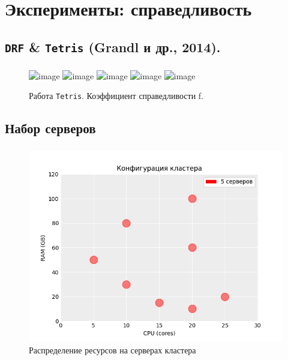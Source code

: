 \documentclass[t]{beamer}  %
\begin{document}
\section{Эксперименты: справедливость}

\subsection{\texttt{DRF} \& \texttt{Tetris} (Grandl и др., 2014).} 

\begin{frame}[fragile]
	\frametitle{\insertsection} 
	\framesubtitle{\insertsubsection}

	\begin{figure}[H]
		\centering
		\includegraphics<1>[width=0.8\linewidth]{images/tetris_pipeline_0} 
		\includegraphics<2>[width=0.8\linewidth]{images/tetris_pipeline_1} 
		\includegraphics<3>[width=0.8\linewidth]{images/tetris_pipeline_2} 
		\includegraphics<4>[width=0.8\linewidth]{images/tetris_pipeline_3} 
		\includegraphics<5>[width=0.8\linewidth]{images/tetris_pipeline_4} 
		\caption*{Работа \texttt{Tetris}. Коэффициент справедливости f.}
	\end{figure}


\end{frame}

\subsection{Набор серверов}

\begin{frame}[fragile]
	\frametitle{\insertsection} 
	\framesubtitle{\insertsubsection}

	\vspace{-0.5cm}
	
\begin{figure}[H]
    \centering 
    \includegraphics[width=0.8\linewidth]{images/hosts_distribution}
    \caption*{Распределение ресурсов на серверах кластера}
\end{figure}


\end{frame}
\end{document}
